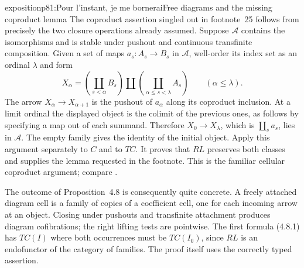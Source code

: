 \begin{dcomment}{exposition}{p81:Pour l'instant, je me bornerai}{Free diagrams and the missing coproduct lemma}
The coproduct assertion singled out in footnote~25 follows from precisely the two closure operations already assumed. Suppose $\mathcal A$ contains the isomorphisms and is stable under pushout and continuous transfinite composition. Given a set of maps $a_s:A_s\to B_s$ in $\mathcal A$, well-order its index set as an ordinal $\lambda$ and form
\[
 X_\alpha=
 \left(\coprod_{s<\alpha}B_s\right)
 \amalg
 \left(\coprod_{\alpha\leq s<\lambda}A_s\right)
 \qquad(\alpha\leq\lambda).
\]
The arrow $X_\alpha\to X_{\alpha+1}$ is the pushout of $a_\alpha$ along its coproduct inclusion. At a limit ordinal the displayed object is the colimit of the previous ones, as follows by specifying a map out of each summand. Therefore $X_0\to X_\lambda$, which is $\coprod_s a_s$, lies in $\mathcal A$. The empty family gives the identity of the initial object. Apply this argument separately to $C$ and to $TC$. It proves that $RL$ preserves both classes and supplies the lemma requested in the footnote. This is the familiar cellular coproduct argument; compare \citet[Lemma~2.1.13]{Hovey1999}.

The outcome of Proposition~4.8 is consequently quite concrete. A freely attached diagram cell is a family of copies of a coefficient cell, one for each incoming arrow at an object. Closing under pushouts and transfinite attachment produces diagram cofibrations; the right lifting tests are pointwise. The first formula (4.8.1) has $TC(I)$ where both occurrences must be $TC(I_0)$, since $RL$ is an endofunctor of the category of families. The proof itself uses the correctly typed assertion.
\end{dcomment}

